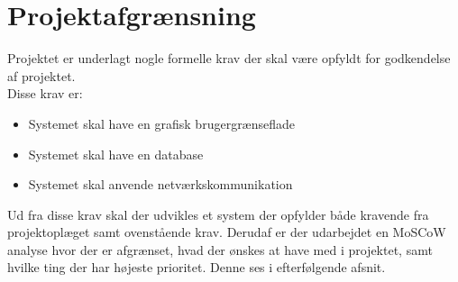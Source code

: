 \chapter{Projektafgrænsning}
Projektet er underlagt nogle formelle krav der skal være opfyldt for godkendelse af projektet. \\
Disse krav er:
\begin{itemize}[noitemsep]
	\item Systemet skal have en grafisk brugergrænseflade
	\item Systemet skal have en database
	\item Systemet skal anvende netværkskommunikation
\end{itemize}

Ud fra disse krav skal der udvikles et system der opfylder både kravende fra projektoplæget samt ovenstående krav. Derudaf er der udarbejdet en MoSCoW analyse hvor der er afgrænset, hvad der ønskes at have med i projektet, samt hvilke ting der har højeste prioritet. Denne ses i efterfølgende afsnit.
